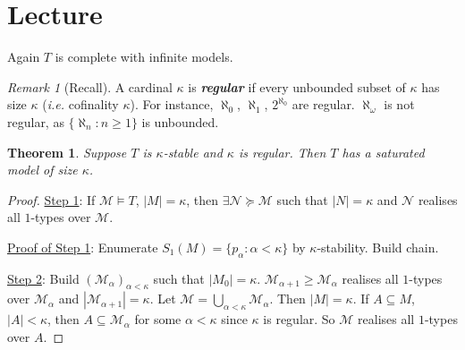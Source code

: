 \documentclass[]{article}
\theoremstyle{custhm}
\newtheorem{theorem}{Theorem}[section]
\theoremstyle{cusdef}
\theoremstyle{custhm}
\theoremstyle{custhm}
\theoremstyle{custhm}
\theoremstyle{ex}
\theoremstyle{custhm}
\theoremstyle{cusdef}
\theoremstyle{remark}
\newtheorem*{remark*}{Remark}
\theoremstyle{remark}
\newcommand{\undf}[1]{\textit{\textbf{#1}}}
\renewcommand{\it}[1]{\textit{#1}}
\newcommand{\M}{\mathcal{M}}
\newcommand{\N}{\mathcal{N}}
\renewcommand{\subset}{\subseteq}
\begin{document}
\section{Lecture}

Again $T$ is complete with infinite models.

\begin{remark*}[Recall]
	A cardinal $\kappa$ is \undf{regular} if every unbounded subset of $\kappa$ has size $\kappa$ (\it{i.e.} cofinality $\kappa$). For instance, $\aleph_0$, $\aleph_1$, $2^{\aleph_0}$ are regular. $\aleph_\omega$ is not regular, as $\{\aleph_n:n\ge 1\}$ is unbounded.
\end{remark*}

\begin{theorem}
	Suppose $T$ is $\kappa$-stable and $\kappa$ is regular. Then $T$ has a saturated model of size $\kappa$.
\end{theorem}
\begin{proof}
	\underline{Step 1}: If $\M\models T$, $|M| = \kappa$, then $\exists \N \succeq \M$ such that $|N| = \kappa$ and $\N$ realises all $1$-types over $\M$.

	\underline{Proof of Step 1}: Enumerate $S_1(M) = \{p_\alpha:\alpha < \kappa\}$ by $\kappa$-stability. Build chain.

	\underline{Step 2}: Build $(\M_\alpha)_{\alpha < \kappa}$ such that $|M_0| = \kappa$. $\M_{\alpha+1}\ge \M_\alpha$ realises all $1$-types over $\M_\alpha$ and $|\M_{\alpha+1}| = \kappa$. Let $\M = \bigcup_{\alpha<\kappa} \M_\alpha$. Then $|M| = \kappa$. If $A\subset M$, $|A| <\kappa$, then $A\subset\M_\alpha$ for some $\alpha < \kappa$ since $\kappa$ is regular. So $\M$ realises all $1$-types over $A$.
\end{proof}
\end{document}
